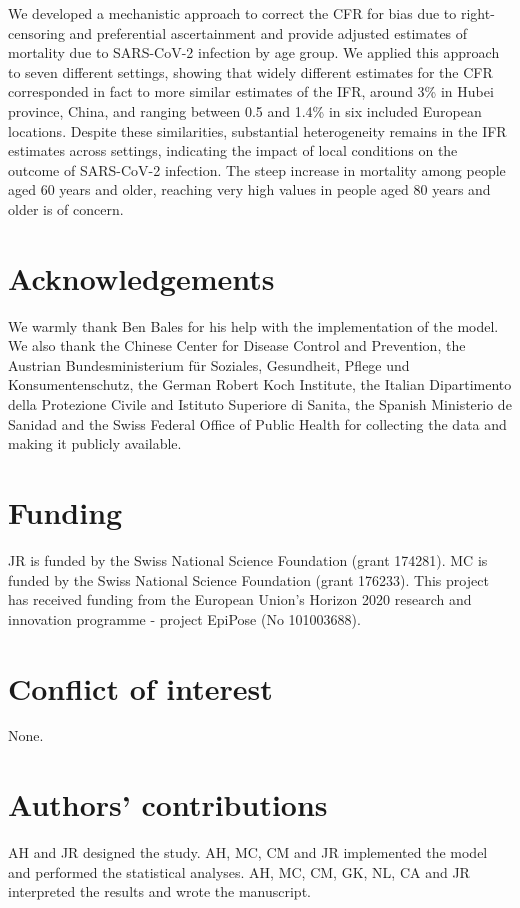 \documentclass{article}
\begin{document}
We developed a mechanistic approach to correct the CFR for bias due to right-censoring and preferential ascertainment and provide adjusted estimates of mortality due to SARS-CoV-2 infection by age group. 
We applied this approach to seven different settings, showing that widely different estimates for the CFR corresponded in fact to more similar estimates of the IFR, around 3\% in Hubei province, China, and ranging between 0.5 and 1.4\% in six included European locations.
Despite these similarities, substantial heterogeneity remains in the IFR estimates across settings, indicating the impact of local conditions on the outcome of SARS-CoV-2 infection.
The steep increase in mortality among people aged 60 years and older, reaching very high values in people aged 80 years and older is of concern. 




  


\section*{Acknowledgements}

We warmly thank Ben Bales for his help with the implementation of the model. We also thank the Chinese Center for Disease Control and Prevention, the Austrian Bundesministerium für Soziales, Gesundheit, Pflege und Konsumentenschutz, the German Robert Koch Institute, the Italian Dipartimento della Protezione Civile and Istituto Superiore di Sanita, the Spanish Ministerio de Sanidad and the Swiss Federal Office of Public Health for collecting the data and making it publicly available.

\section*{Funding}

JR is funded by the Swiss National Science Foundation (grant 174281). MC is funded by the Swiss National Science Foundation (grant 176233). This project has received funding from the European Union's Horizon 2020 research and innovation programme - project EpiPose (No 101003688).

\section*{Conflict of interest}

None.

\section*{Authors' contributions}

AH and JR designed the study. 
AH, MC, CM and JR implemented the model and performed the statistical analyses. 
AH, MC, CM, GK, NL, CA and JR interpreted the results and wrote the manuscript.
\end{document}
